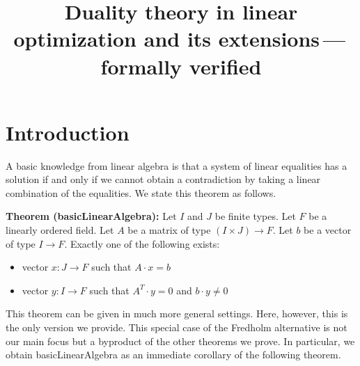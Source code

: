 \documentclass[]{article}
\renewcommand{\.}{\hskip .75pt}
\let\r=\rightarrow
\let\*=\cdot
\begin{document}


\title{Duality theory in linear optimization and its extensions\,---\,formally verified}
\date{}
\maketitle


\section{Introduction}

A basic knowledge from linear algebra is that
a system of linear equalities has a solution if and only if
we cannot obtain a contradiction by taking a linear combination of the equalities.
We state this theorem as follows.

\medskip \noindent
\textbf{Theorem (basicLinearAlgebra):}
Let $I$ and $J$ be finite types.
Let $F$ be a linearly ordered field.
Let $A$ be a matrix of type $(I \times J) \r F$.
Let $b$ be a vector of type $I \r F$.
Exactly one of the following exists:
\begin{itemize}
\item vector $x : J \r F$ such that $A \* x = b$
\item vector $y : I \r F$ such that $A^T\! \* y = 0$ and $b \* y \neq 0$
\end{itemize}
This theorem can be given in much more general settings.
Here, however, this is the only version we provide.
This special case of the Fredholm alternative is not our main focus
but a byproduct of the other theorems we prove.
In particular, we obtain basicLinearAlgebra as an immediate corollary
of the following theorem.
\end{document}
